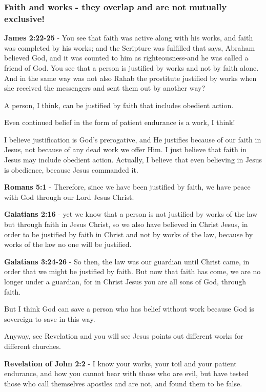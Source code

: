 \documentclass[11pt]{article}
\begin{document}
\subsubsection{Faith and works - they overlap and are \textbf{not} mutually exclusive!}
\label{sec:org4be50be}
\textbf{James 2:22-25} - You see that faith was active along with his works, and faith was completed by his works; and the Scripture was fulfilled that says, Abraham believed God, and it was counted to him as righteousness-and he was called a friend of God. You see that a person is justified by works and not by faith alone. And in the same way was not also Rahab the prostitute justified by works when she received the messengers and sent them out by another way?

A person, I think, can be justified by faith that includes obedient action.

Even continued belief in the form of patient endurance is a work, I think!

I believe justification is God's prerogative, and He justifies because of our faith in Jesus, not because of any dead work we offer Him. I just believe that faith in Jesus may include obedient action.
Actually, I believe that even believing in Jesus is obedience, because Jesus commanded it.

\textbf{Romans 5:1} - Therefore, since we have been justified by faith, we have peace with God through our Lord Jesus Christ.

\textbf{Galatians 2:16} - yet we know that a person is not justified by works of the law but through faith in Jesus Christ, so we also have believed in Christ Jesus, in order to be justified by faith in Christ and not by works of the law, because by works of the law no one will be justified.

\textbf{Galatians 3:24-26} - So then, the law was our guardian until Christ came, in order that we might be justified by faith. But now that faith has come, we are no longer under a guardian, for in Christ Jesus you are all sons of God, through faith.

But I think God can save a person who has belief without work because God is sovereign to save in this way.

Anyway, see Revelation and you will see Jesus points out different works for different churches.

\textbf{Revelation of John 2:2} - I know your works, your toil and your patient endurance, and how you cannot bear with those who are evil, but have tested those who call themselves apostles and are not, and found them to be false.
\end{document}
